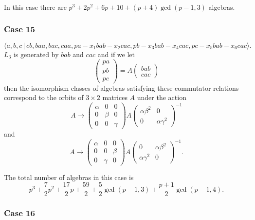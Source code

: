 \documentclass[10pt]{article}
\begin{document}
In this case there are $p^{3}+2p^{2}+6p+10+(p+4)\gcd (p-1,3)$ algebras.

\subsubsection{Case 15}

\begin{equation}
\langle
a,b,c\,|%
\,cb,baa,bac,caa,pa-x_{1}bab-x_{2}cac,pb-x_{3}bab-x_{4}cac,pc-x_{5}bab-x_{6}cac\rangle .
\tag{7.771}
\end{equation}%
$L_{3}$ is generated by $bab$ and $cac$ and if we let 
\[
\left( 
\begin{array}{l}
pa \\ 
pb \\ 
pc%
\end{array}%
\right) =A\left( 
\begin{array}{l}
bab \\ 
cac%
\end{array}%
\right) 
\]%
then the isomorphism classes of algebras satisfying these commutator
relations correspond to the orbits of $3\times 2$ matrices $A$ under the
action 
\[
A\rightarrow \left( 
\begin{array}{lll}
\alpha & 0 & 0 \\ 
0 & \beta & 0 \\ 
0 & 0 & \gamma%
\end{array}%
\right) A\left( 
\begin{array}{ll}
\alpha \beta ^{2} & 0 \\ 
0 & \alpha \gamma ^{2}%
\end{array}%
\right) ^{-1} 
\]%
and 
\[
A\rightarrow \left( 
\begin{array}{lll}
\alpha & 0 & 0 \\ 
0 & 0 & \beta \\ 
0 & \gamma & 0%
\end{array}%
\right) A\left( 
\begin{array}{ll}
0 & \alpha \beta ^{2} \\ 
\alpha \gamma ^{2} & 0%
\end{array}%
\right) ^{-1}. 
\]

The total number of algebras in this case is 
\[
\allowbreak p^{3}+\frac{7}{2}p^{2}+\frac{17}{2}p+\frac{59}{2}+\frac{5}{2}%
\gcd (p-1,3)+\frac{p+1}{2}\gcd (p-1,4). 
\]

\subsubsection{Case 16}
\end{document}

